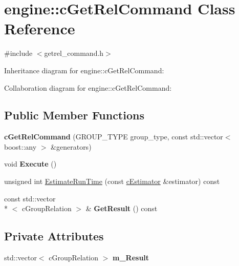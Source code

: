 \hypertarget{classengine_1_1cGetRelCommand}{\section{engine\-:\-:c\-Get\-Rel\-Command Class Reference}
\label{classengine_1_1cGetRelCommand}
}


{\ttfamily \#include $<$getrel\-\_\-command.\-h$>$}



Inheritance diagram for engine\-:\-:c\-Get\-Rel\-Command\-:


Collaboration diagram for engine\-:\-:c\-Get\-Rel\-Command\-:
\subsection*{Public Member Functions}
\begin{DoxyCompactItemize}
\item 
\hypertarget{classengine_1_1cGetRelCommand_aa6962470ec3861855bab696e13cf8a63}{{\bfseries c\-Get\-Rel\-Command} (G\-R\-O\-U\-P\-\_\-\-T\-Y\-P\-E group\-\_\-type, const std\-::vector$<$ boost\-::any $>$ \&generators)}\label{classengine_1_1cGetRelCommand_aa6962470ec3861855bab696e13cf8a63}

\item 
\hypertarget{classengine_1_1cGetRelCommand_a77179357376646c2c4885652cd80b4d2}{void {\bfseries Execute} ()}\label{classengine_1_1cGetRelCommand_a77179357376646c2c4885652cd80b4d2}

\item 
unsigned int \hyperlink{classengine_1_1cGetRelCommand_ad6aa9cb526ae1b73237edaad02d081ec}{Estimate\-Run\-Time} (const \hyperlink{classengine_1_1cEstimator}{c\-Estimator} \&estimator) const 
\item 
\hypertarget{classengine_1_1cGetRelCommand_a7cc00a86111fba4dceacf1213e05bc80}{const std\-::vector\\*
$<$ c\-Group\-Relation $>$ \& {\bfseries Get\-Result} () const }\label{classengine_1_1cGetRelCommand_a7cc00a86111fba4dceacf1213e05bc80}

\end{DoxyCompactItemize}
\subsection*{Private Attributes}
\begin{DoxyCompactItemize}
\item 
\hypertarget{classengine_1_1cGetRelCommand_a6d84c8a5636d079347ae0507fecba6cf}{std\-::vector$<$ c\-Group\-Relation $>$ {\bfseries m\-\_\-\-Result}}\label{classengine_1_1cGetRelCommand_a6d84c8a5636d079347ae0507fecba6cf}

\end{DoxyCompactItemize}
